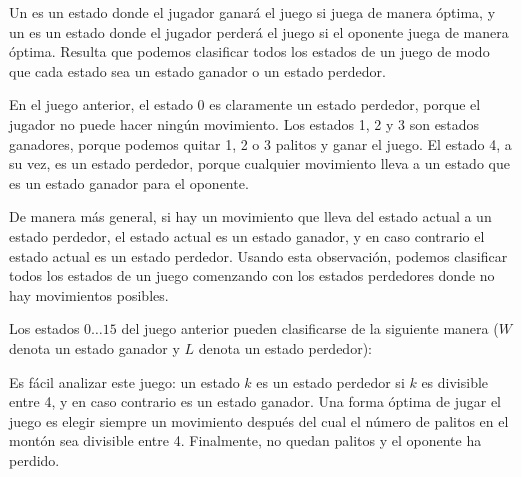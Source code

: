 Un  es un estado donde
el jugador ganará el juego si
juega de manera óptima,
y un  es un estado
donde el jugador perderá el juego si el
oponente juega de manera óptima.
Resulta que podemos clasificar todos los estados
de un juego de modo que cada estado sea
un estado ganador o un estado perdedor.

En el juego anterior, el estado 0 es claramente un
estado perdedor, porque el jugador no puede hacer
ningún movimiento.
Los estados 1, 2 y 3 son estados ganadores,
porque podemos quitar 1, 2 o 3 palitos
y ganar el juego.
El estado 4, a su vez, es un estado perdedor,
porque cualquier movimiento lleva a un estado que
es un estado ganador para el oponente.

De manera más general, si hay un movimiento que lleva
del estado actual a un estado perdedor,
el estado actual es un estado ganador,
y en caso contrario el estado actual es un estado perdedor.
Usando esta observación, podemos clasificar todos los estados
de un juego comenzando con los estados perdedores donde
no hay movimientos posibles.

Los estados $0 \ldots 15$ del juego anterior
pueden clasificarse de la siguiente manera
($W$ denota un estado ganador y $L$ denota un estado perdedor):
\begin{center}
\end{center}

Es fácil analizar este juego:
un estado $k$ es un estado perdedor si $k$ es
divisible entre 4, y en caso contrario
es un estado ganador.
Una forma óptima de jugar el juego es
elegir siempre un movimiento después del cual
el número de palitos en el montón
sea divisible entre 4.
Finalmente, no quedan palitos y
el oponente ha perdido.

